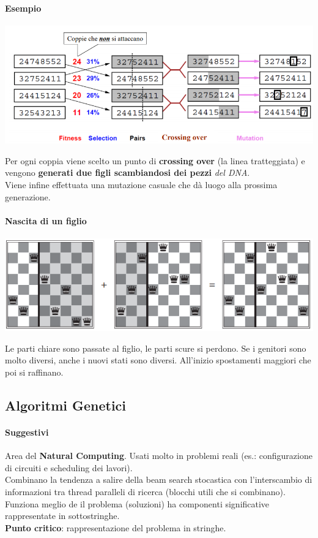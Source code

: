 \documentclass[10pt]{book}
\begin{document}
\paragraph{Esempio}
\begin{center}
	\includegraphics[scale=0.7]{alggenetic.png}
\end{center}
Per ogni coppia viene scelto un punto di \textbf{crossing over} (la linea tratteggiata) e vengono \textbf{generati due figli scambiandosi dei pezzi} \textit{del DNA}.\\
Viene infine effettuata una mutazione casuale che dà luogo alla prossima generazione.
\pagebreak
\paragraph{Nascita di un figlio}
\begin{center}
	\includegraphics[scale=0.7]{8reggeneticfigli.png}
\end{center}
Le parti chiare sono passate al figlio, le parti scure si perdono. Se i genitori sono molto diversi, anche i nuovi stati sono diversi. All'inizio spostamenti maggiori che poi si raffinano.
\subsection*{Algoritmi Genetici}
\paragraph{Suggestivi} Area del \textbf{Natural Computing}. Usati molto in problemi reali (es.: configurazione di circuiti e scheduling dei lavori).\\
Combinano la tendenza a salire della beam search stocastica con l'interscambio di informazioni tra thread paralleli di ricerca (blocchi utili che si combinano).\\
Funziona meglio de il problema (soluzioni) ha componenti significative rappresentate in sottostringhe.\\
\textbf{Punto critico}: rappresentazione del problema in stringhe.
\end{document}
